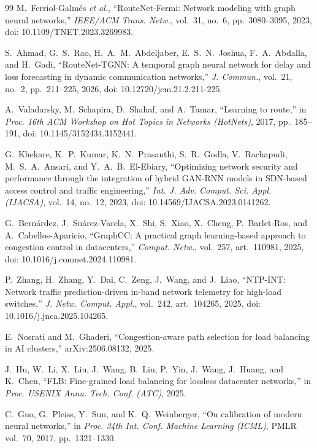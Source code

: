 \documentclass[conference]{IEEEtran}
\begin{document}
\begin{thebibliography}{99}
M.~Ferriol-Galm{\'e}s \emph{et al.}, ``RouteNet-Fermi: Network modeling with graph neural networks,'' \emph{IEEE/ACM Trans. Netw.}, vol.~31, no.~6, pp.~3080--3095, 2023, doi: 10.1109/TNET.2023.3269983.

S.~Ahmad, G.~S.~Rao, H.~A.~M.~Abdeljaber, E.~S.~N.~Joshua, F.~A.~Abdalla, and H.~Gadi, ``RouteNet-TGNN: A temporal graph neural network for delay and loss forecasting in dynamic communication networks,'' \emph{J. Commun.}, vol.~21, no.~2, pp.~211--225, 2026, doi: 10.12720/jcm.21.2.211-225.

A.~Valadarsky, M.~Schapira, D.~Shahaf, and A.~Tamar, ``Learning to route,'' in \emph{Proc. 16th ACM Workshop on Hot Topics in Networks (HotNets)}, 2017, pp.~185--191, doi: 10.1145/3152434.3152441.

G.~Khekare, K.~P.~Kumar, K.~N.~Prasanthi, S.~R.~Godla, V.~Rachapudi, M.~S.~A.~Ansari, and Y.~A.~B.~El-Ebiary, ``Optimizing network security and performance through the integration of hybrid GAN-RNN models in SDN-based access control and traffic engineering,'' \emph{Int. J. Adv. Comput. Sci. Appl. (IJACSA)}, vol.~14, no.~12, 2023, doi: 10.14569/IJACSA.2023.0141262.

G.~Bern{\'a}rdez, J.~Su{\'a}rez-Varela, X.~Shi, S.~Xiao, X.~Cheng, P.~Barlet-Ros, and A.~Cabellos-Aparicio, ``GraphCC: A practical graph learning-based approach to congestion control in datacenters,'' \emph{Comput. Netw.}, vol.~257, art.~110981, 2025, doi: 10.1016/j.comnet.2024.110981.

P.~Zhang, H.~Zhang, Y.~Dai, C.~Zeng, J.~Wang, and J.~Liao, ``NTP-INT: Network traffic prediction-driven in-band network telemetry for high-load switches,'' \emph{J. Netw. Comput. Appl.}, vol.~242, art.~104265, 2025, doi: 10.1016/j.jnca.2025.104265.

E.~Nosrati and M.~Ghaderi, ``Congestion-aware path selection for load balancing in AI clusters,'' arXiv:2506.08132, 2025.

J.~Hu, W.~Li, X.~Liu, J.~Wang, B.~Liu, P.~Yin, J.~Wang, J.~Huang, and K.~Chen, ``FLB: Fine-grained load balancing for lossless datacenter networks,'' in \emph{Proc. USENIX Annu. Tech. Conf. (ATC)}, 2025.

C.~Guo, G.~Pleiss, Y.~Sun, and K.~Q.~Weinberger, ``On calibration of modern neural networks,'' in \emph{Proc. 34th Int. Conf. Machine Learning (ICML)}, PMLR vol.~70, 2017, pp.~1321--1330.

\end{thebibliography}
\end{document}
